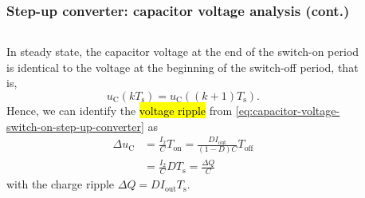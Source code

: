 \begin{frame}
    \frametitle{Step-up converter: capacitor voltage analysis (cont.)}
    \begin{columns}
        \begin{column}{0.5\textwidth}
            In steady state, the capacitor voltage at the end of the switch-on period is identical to the voltage at the beginning of the switch-off period, that is,
            \begin{equation*}
                    u_\mathrm{C}(kT_\mathrm{s}) = u_\mathrm{C}((k+1)T_\mathrm{s}).
            \end{equation*}
            Hence, we can identify the \hl{voltage ripple} from \eqref{eq:capacitor-voltage-switch-on-step-up-converter} as
            \begin{equation}
                \begin{split}
                    \Delta u_\mathrm{C}&=\frac{I_2}{C}T_\mathrm{on} = \frac{DI_\mathrm{out}}{(1-D)C}T_\mathrm{off}\\
                                       &=\frac{I_2}{C}DT_\mathrm{s}=\frac{\Delta Q}{C} 
                \end{split}
            \end{equation}
            with the charge ripple $\Delta Q = DI_\mathrm{out}T_\mathrm{s}$.
        \end{column}
        \begin{column}{0.5\textwidth}
            \begin{figure}
\end{figure}
\end{column}
\end{columns}
\end{frame}
